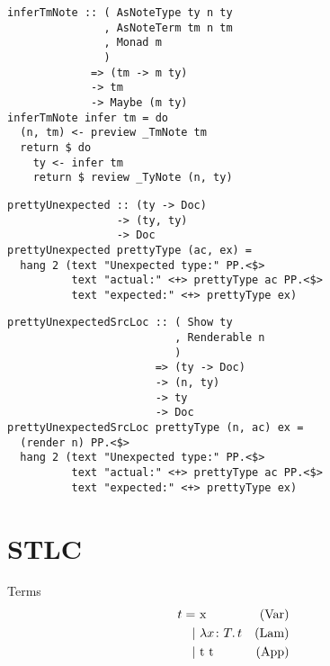 \documentclass[aspectration=169]{beamer}
\begin{document}
\begin{frame}[fragile]
  \begin{verbatim}
inferTmNote :: ( AsNoteType ty n ty
               , AsNoteTerm tm n tm
               , Monad m
               )
             => (tm -> m ty)
             -> tm
             -> Maybe (m ty)
inferTmNote infer tm = do
  (n, tm) <- preview _TmNote tm
  return $ do
    ty <- infer tm
    return $ review _TyNote (n, ty)
  \end{verbatim}
\end{frame} 

\begin{frame}[fragile]
  \begin{verbatim}
prettyUnexpected :: (ty -> Doc)
                 -> (ty, ty)
                 -> Doc
prettyUnexpected prettyType (ac, ex) =
  hang 2 (text "Unexpected type:" PP.<$>
          text "actual:" <+> prettyType ac PP.<$>
          text "expected:" <+> prettyType ex)
  \end{verbatim}
\end{frame} 

\begin{frame}[fragile]
  \begin{verbatim}
prettyUnexpectedSrcLoc :: ( Show ty
                          , Renderable n
                          )
                       => (ty -> Doc)
                       -> (n, ty)
                       -> ty
                       -> Doc
prettyUnexpectedSrcLoc prettyType (n, ac) ex =
  (render n) PP.<$>
  hang 2 (text "Unexpected type:" PP.<$>
          text "actual:" <+> prettyType ac PP.<$>
          text "expected:" <+> prettyType ex)
  \end{verbatim}
\end{frame} 

\section{STLC}

\begin{frame}[c]
  Terms
  \begin{displaymath}
    \begin{aligned}
t =& \ \text{x} & \text{(Var)}\\
  |& \ \lambda x \colon T \ldotp t & \text{(Lam)}\\
  |& \ \text{t t} & \text{(App)}
    \end{aligned}
  \end{displaymath}
\end{frame}
\end{document}
